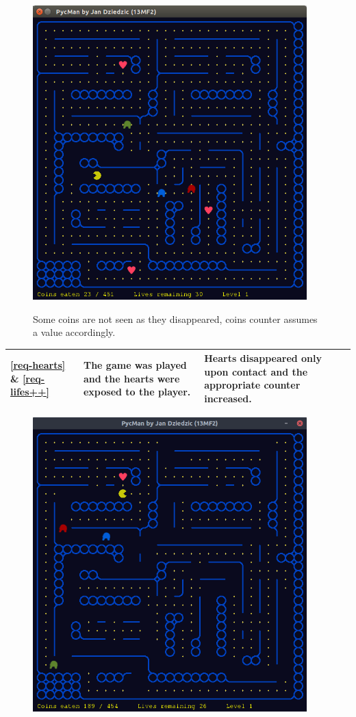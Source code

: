 \documentclass[11pt,a4paper,notitlepage]{report}
\newenvironment{img}{
	\begin{center}
		\begin{figure}[H]
			\begin{center}
			
}{
	\end{center}
		\end{figure}
			\end{center}
}
\begin{document}
\begin{center}
\begin{img}
					\includegraphics[width=300pt]{images/player_facing_left.png}\\
					\caption{Some coins are not seen as they disappeared, coins counter assumes a value accordingly.}
				\end{img}
				\begin{longtable}{ | p{2cm} | p{5cm} | p{4cm} |}
					\hline	
					\ref{req-hearts} \& \ref{req-lifes++}&The game was played and the hearts were exposed to the player.&Hearts disappeared only upon contact and the appropriate counter increased. \\ \hline
				\end{longtable}
				\begin{img}
					\includegraphics[width=300pt]{images/hearts-working0.png}\\

\end{img}
\end{center}
\end{document}
